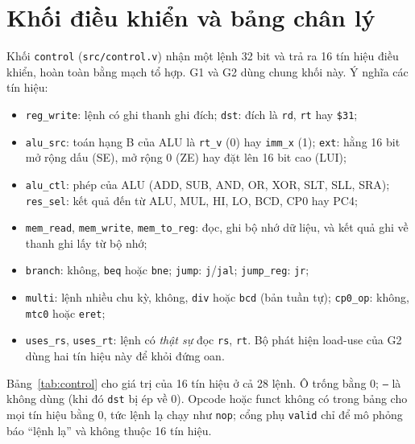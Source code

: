 \section{Khối điều khiển và bảng chân lý}\label{sec:control}
Khối \texttt{control} (\texttt{src/control.v}) nhận một lệnh 32 bit và trả ra 16 tín hiệu điều khiển, hoàn toàn bằng mạch tổ hợp. G1 và G2 dùng chung khối này. Ý nghĩa các tín hiệu:
\begin{itemize}
  \item \texttt{reg\_write}: lệnh có ghi thanh ghi đích; \texttt{dst}: đích là \texttt{rd}, \texttt{rt} hay \texttt{\$31};
  \item \texttt{alu\_src}: toán hạng B của ALU là \texttt{rt\_v} (0) hay \texttt{imm\_x} (1); \texttt{ext}: hằng 16 bit mở rộng dấu (SE), mở rộng 0 (ZE) hay đặt lên 16 bit cao (LUI);
  \item \texttt{alu\_ctl}: phép của ALU (ADD, SUB, AND, OR, XOR, SLT, SLL, SRA); \texttt{res\_sel}: kết quả đến từ ALU, MUL, HI, LO, BCD, CP0 hay PC4;
  \item \texttt{mem\_read}, \texttt{mem\_write}, \texttt{mem\_to\_reg}: đọc, ghi bộ nhớ dữ liệu, và kết quả ghi về thanh ghi lấy từ bộ nhớ;
  \item \texttt{branch}: không, \texttt{beq} hoặc \texttt{bne}; \texttt{jump}: \texttt{j}/\texttt{jal}; \texttt{jump\_reg}: \texttt{jr};
  \item \texttt{multi}: lệnh nhiều chu kỳ, không, \texttt{div} hoặc \texttt{bcd} (bản tuần tự); \texttt{cp0\_op}: không, \texttt{mtc0} hoặc \texttt{eret};
  \item \texttt{uses\_rs}, \texttt{uses\_rt}: lệnh có \emph{thật sự} đọc \texttt{rs}, \texttt{rt}. Bộ phát hiện load-use của G2 dùng hai tín hiệu này để khỏi đứng oan.
\end{itemize}
Bảng~\ref{tab:control} cho giá trị của 16 tín hiệu ở cả 28 lệnh. Ô trống bằng 0; \texttt{--} là không dùng (khi đó \texttt{dst} bị ép về 0). Opcode hoặc funct không có trong bảng cho mọi tín hiệu bằng 0, tức lệnh lạ chạy như \texttt{nop}; cổng phụ \texttt{valid} chỉ để mô phỏng báo ``lệnh lạ'' và không thuộc 16 tín hiệu.

